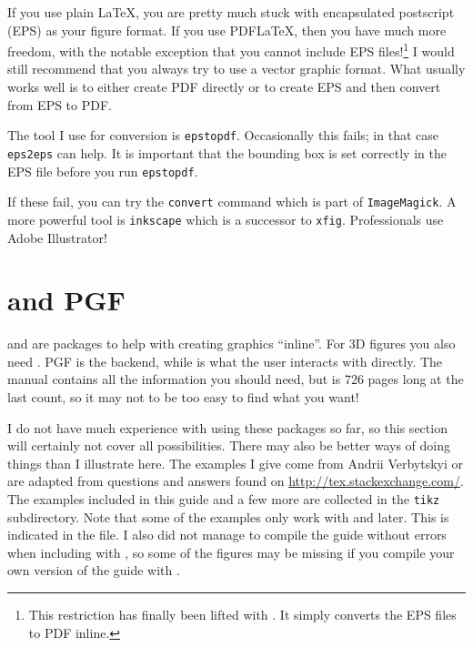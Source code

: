 If you use plain \LaTeX, you are pretty much stuck with encapsulated
postscript (EPS) as your figure format. If you use PDF\LaTeX, then you
have much more freedom, with the notable exception that you cannot
include EPS files!\footnote{%
This restriction has finally been lifted with . It
simply converts the EPS files to PDF inline.}
I would still recommend that you always try to use
a vector graphic format. What usually works well is to either create
PDF directly or to create EPS and then convert from EPS to PDF.

The tool I use for conversion is \texttt{epstopdf}. Occasionally this
fails; in that case \texttt{eps2eps} can help. It is important that
the bounding box is set correctly in the EPS file before you run
\texttt{epstopdf}.

If these fail, you can try the \texttt{convert} command which is part
of \texttt{ImageMagick}. A more powerful tool is \texttt{inkscape}
which is a successor to \texttt{xfig}. Professionals use Adobe Illustrator!


\section{\TikZ and PGF}
\label{sec:fig:tikz}

 and  are packages to help with
creating graphics \enquote{inline}. For 3D figures you also need
. PGF is the backend, while \TikZ is what the
user interacts with directly. The manual contains all the information
you should need, but is 726 pages long at the last count, so it may
not to be too easy to find what you want!

I do not have much experience with using these packages so far, so
this section will certainly not cover all possibilities. There may
also be better ways of doing things than I illustrate here. The
examples I give come from Andrii Verbytskyi or are adapted from
questions and answers found on
\url{http://tex.stackexchange.com/}. The examples included in this
guide and a few more are collected in the \texttt{tikz}
subdirectory. Note that some of the examples only work with  and later. This is indicated in the file. I also did not manage
to compile the guide without errors when including  with
, so some of the figures may be missing if you compile
your own version of the guide with .

